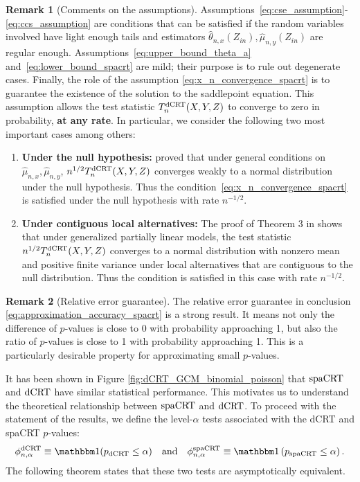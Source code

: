 \documentclass[12pt]{article}
\theoremstyle{definition}
\newtheorem{remark}{Remark}
\newcommand{\indicator}{\mathbbm 1}						%
\newcommand{\srx}{X}									%
\newcommand{\srz}{Z}									%
\newcommand{\sry}{Y}									%
\newcommand{\dCRT}{\textnormal{dCRT}} 					%
\newcommand{\spacrt}{\textnormal{spaCRT}}               %
\begin{document}
\begin{remark}[Comments on the assumptions]
  Assumptions~\eqref{eq:cse_assumption}-\eqref{eq:ccs_assumption} are conditions that can be satisfied if the random variables involved have light enough tails and estimators $\widehat{\theta}_{n,x}(\srz_{in}),\widehat{\mu}_{n,y}(\srz_{in})$ are regular enough. Assumptions~\eqref{eq:upper_bound_theta_a} and~\eqref{eq:lower_bound_spacrt} are mild; their purpose is to rule out degenerate cases. Finally, the role of the assumption \eqref{eq:x_n_convergence_spacrt} is to guarantee the existence of the solution to the saddlepoint equation. This assumption allows the test statistic $T_n^{\dCRT}(\srx,\sry,\srz)$ to converge to zero in probability, \textbf{at any rate}. In particular, we consider the following two most important cases among others:
  \begin{enumerate}
    \item \textbf{Under the null hypothesis:} \citet{Shah2018} proved that under general conditions on $\widehat{\mu}_{n,x},\widehat{\mu}_{n,y}$, $n^{1/2}T_n^{\dCRT}(\srx,\sry,\srz)$ converges weakly to a normal distribution under the null hypothesis. Thus the condition~\eqref{eq:x_n_convergence_spacrt} is satisfied under the null hypothesis with rate $n^{-1/2}$.
    \item \textbf{Under contiguous local alternatives:} The proof of Theorem 3 in \citet{Niu2022a} shows that under generalized partially linear models, the test statistic $n^{1/2}T_n^{\dCRT}(\srx,\sry,\srz)$ converges to a normal distribution with nonzero mean and positive finite variance under local alternatives that are contiguous to the null distribution. Thus the condition is satisfied in this case with rate $n^{-1/2}$.
  \end{enumerate}
\end{remark}

\begin{remark}[Relative error guarantee]
	The relative error guarantee in conclusion \eqref{eq:approximation_accuracy_spacrt} is a strong result. It means not only the difference of $p$-values is close to $0$ with probability approaching 1, but also the ratio of $p$-values is close to 1 with probability approaching 1. This is a particularly desirable property for approximating small $p$-values.
\end{remark}

It has been shown in Figure \ref{fig:dCRT_GCM_binomial_poisson} that $\spacrt$ and $\dCRT$ have similar statistical performance. This motivates us to understand the theoretical relationship between $\spacrt$ and $\dCRT$. To proceed with the statement of the results, we define the level-$\alpha$ tests associated with the dCRT and spaCRT $p$-values:
\begin{align*}
\phi^{\dCRT}_{n,\alpha} \equiv \indicator(p_{\dCRT} \leq \alpha) \quad \text{and} \quad	\phi^{\spacrt}_{n,\alpha}\equiv \indicator\left(p_{\spacrt} \leq \alpha\right).
\end{align*}
The following theorem states that these two tests are asymptotically equivalent.
\end{document}
